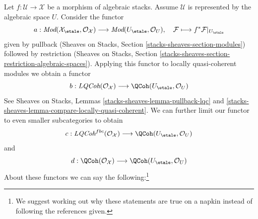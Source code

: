 \medskip\noindent
Let $f : \mathcal{U} \to \mathcal{X}$ be a morphism of algebraic stacks.
Assume $\mathcal{U}$ is represented by the algebraic space $U$.
Consider the functor
$$
a :
\textit{Mod}(\mathcal{X}_\etale, \mathcal{O}_\mathcal{X})
\longrightarrow
\textit{Mod}(U_\etale, \mathcal{O}_U),\quad
\mathcal{F}
\longmapsto
f^*\mathcal{F}|_{U_\etale}
$$
given by pullback (Sheaves on Stacks, Section
\ref{stacks-sheaves-section-modules}) followed by restriction
(Sheaves on Stacks, Section
\ref{stacks-sheaves-section-restriction-algebraic-spaces}).
Applying this functor to locally quasi-coherent modules we obtain a functor
$$
b : \textit{LQCoh}(\mathcal{O}_\mathcal{X})
\longrightarrow
\QCoh(U_\etale, \mathcal{O}_U)
$$
See Sheaves on Stacks, Lemmas \ref{stacks-sheaves-lemma-pullback-lqc} and
\ref{stacks-sheaves-lemma-compare-locally-quasi-coherent}.
We can further limit our functor to even smaller subcategories to obtain
$$
c :
\textit{LQCoh}^{fbc}(\mathcal{O}_\mathcal{X})
\longrightarrow
\QCoh(U_\etale, \mathcal{O}_U)
$$
and
$$
d :
\QCoh(\mathcal{O}_\mathcal{X})
\longrightarrow
\QCoh(U_\etale, \mathcal{O}_U)
$$
About these functors we can say the following:\footnote{We suggest
working out why these statements are true on a napkin instead of
following the references given.}
